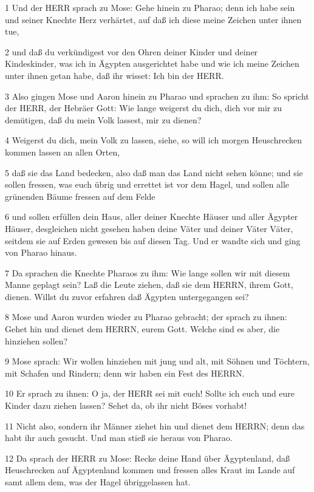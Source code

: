 \par 1 Und der HERR sprach zu Mose: Gehe hinein zu Pharao; denn ich habe sein und seiner Knechte Herz verhärtet, auf daß ich diese meine Zeichen unter ihnen tue,
\par 2 und daß du verkündigest vor den Ohren deiner Kinder und deiner Kindeskinder, was ich in Ägypten ausgerichtet habe und wie ich meine Zeichen unter ihnen getan habe, daß ihr wisset: Ich bin der HERR.
\par 3 Also gingen Mose und Aaron hinein zu Pharao und sprachen zu ihm: So spricht der HERR, der Hebräer Gott: Wie lange weigerst du dich, dich vor mir zu demütigen, daß du mein Volk lassest, mir zu dienen?
\par 4 Weigerst du dich, mein Volk zu lassen, siehe, so will ich morgen Heuschrecken kommen lassen an allen Orten,
\par 5 daß sie das Land bedecken, also daß man das Land nicht sehen könne; und sie sollen fressen, was euch übrig und errettet ist vor dem Hagel, und sollen alle grünenden Bäume fressen auf dem Felde
\par 6 und sollen erfüllen dein Haus, aller deiner Knechte Häuser und aller Ägypter Häuser, desgleichen nicht gesehen haben deine Väter und deiner Väter Väter, seitdem sie auf Erden gewesen bis auf diesen Tag. Und er wandte sich und ging von Pharao hinaus.
\par 7 Da sprachen die Knechte Pharaos zu ihm: Wie lange sollen wir mit diesem Manne geplagt sein? Laß die Leute ziehen, daß sie dem HERRN, ihrem Gott, dienen. Willst du zuvor erfahren daß Ägypten untergegangen sei?
\par 8 Mose und Aaron wurden wieder zu Pharao gebracht; der sprach zu ihnen: Gehet hin und dienet dem HERRN, eurem Gott. Welche sind es aber, die hinziehen sollen?
\par 9 Mose sprach: Wir wollen hinziehen mit jung und alt, mit Söhnen und Töchtern, mit Schafen und Rindern; denn wir haben ein Fest des HERRN.
\par 10 Er sprach zu ihnen: O ja, der HERR sei mit euch! Sollte ich euch und eure Kinder dazu ziehen lassen? Sehet da, ob ihr nicht Böses vorhabt!
\par 11 Nicht also, sondern ihr Männer ziehet hin und dienet dem HERRN; denn das habt ihr auch gesucht. Und man stieß sie heraus von Pharao.
\par 12 Da sprach der HERR zu Mose: Recke deine Hand über Ägyptenland, daß Heuschrecken auf Ägyptenland kommen und fressen alles Kraut im Lande auf samt allem dem, was der Hagel übriggelassen hat.
